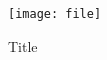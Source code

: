\begin{figure}                                                                                        
 \centering                                                                      
 \texttt{[image: file]}                                             
 \caption{Title} \label{Label}
\end{figure}
